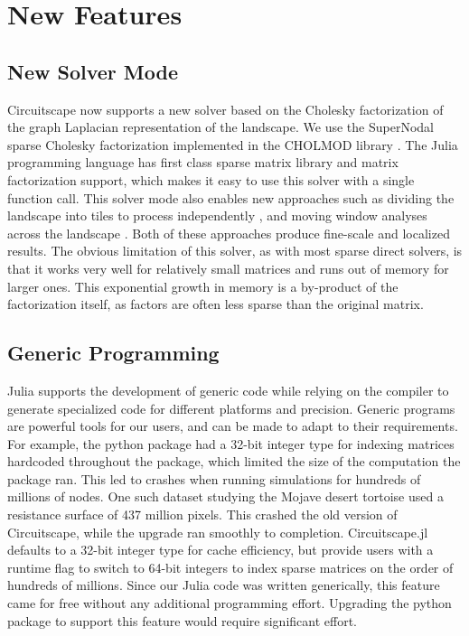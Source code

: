 \documentclass{juliacon}
\begin{document}
\section{New Features}

\subsection{New Solver Mode}

Circuitscape now supports a new solver based on the Cholesky factorization of the graph Laplacian representation of the landscape. We use the SuperNodal sparse Cholesky factorization implemented in the CHOLMOD library \cite{chen2008algorithm}. The Julia programming language has first class sparse matrix library and matrix factorization support, which makes it easy to use this solver with a single function call. This solver mode also enables new approaches such as dividing the landscape into tiles to process independently \cite{pelletier2014applying}, and moving window analyses across the landscape \cite{mcrae2016conserving}. Both of these approaches produce fine-scale and localized results. The obvious limitation of this solver, as with most sparse direct solvers, is that it works very well for relatively small matrices and runs out of memory for larger ones. This exponential growth in memory is a by-product of the factorization itself, as factors are often less sparse than the original matrix. 


\subsection{Generic Programming}

Julia supports the development of generic code while relying on the compiler to generate specialized code for different platforms and precision. Generic programs are powerful tools for our users, and can be made to adapt to their requirements. For example, the python package had a 32-bit integer type for indexing matrices hardcoded throughout the package, which limited the size of the computation the package ran. This led to crashes when running simulations for hundreds of millions of nodes. One such dataset studying the Mojave desert tortoise \cite{gray2019} used a resistance surface of 437 million pixels. This crashed the old version of Circuitscape, while the upgrade ran smoothly to completion. Circuitscape.jl defaults to a 32-bit integer type for cache efficiency, but provide users with a runtime flag to switch to 64-bit integers to index sparse matrices on the order of hundreds of millions. Since our Julia code was written generically, this feature came for free without any additional programming effort. Upgrading the python package to support this feature would require significant effort. 
\end{document}
